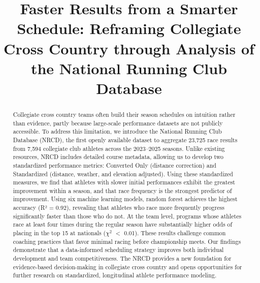 \documentclass[suppldata]{interact}
\theoremstyle{plain}%
\theoremstyle{definition}
\theoremstyle{remark}
\begin{document}
\title{Faster Results from a Smarter Schedule: Reframing Collegiate Cross Country through Analysis of the National Running Club Database}


\author{
}


\maketitle

\begin{abstract}
Collegiate cross country teams often build their season schedules on intuition rather than evidence, partly because large-scale performance datasets are not publicly accessible. To address this limitation, we introduce the National Running Club Database (NRCD), the first openly available dataset to aggregate 23,725 race results from 7,594 collegiate club athletes across the 2023–2025 seasons. Unlike existing resources, NRCD includes detailed course metadata, allowing us to develop two standardized performance metrics: Converted Only (distance correction) and Standardized (distance, weather, and elevation adjusted). Using these standardized measures, we find that athletes with slower initial performances exhibit the greatest improvement within a season, and that race frequency is the strongest predictor of improvement. Using six machine learning models, random forest achieves the highest accuracy (R² = 0.92), revealing that athletes who race more frequently progress significantly faster than those who do not. At the team level, programs whose athletes race at least four times during the regular season have substantially higher odds of placing in the top 15 at nationals ($\chi^2$ $<$ 0.01). These results challenge common coaching practices that favor minimal racing before championship meets. Our findings demonstrate that a data-informed scheduling strategy improves both individual development and team competitiveness. The NRCD provides a new foundation for evidence-based decision-making in collegiate cross country and opens opportunities for further research on standardized, longitudinal athlete performance modeling.
\end{abstract}
\end{document}

